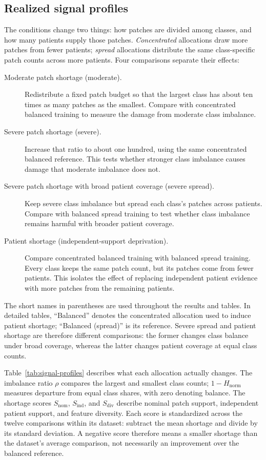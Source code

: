 \documentclass[11pt]{article}
\begin{document}
\subsection{Realized signal profiles}
\label{sec:rq1-profiles}
The conditions change two things: how patches are divided among classes, and how many patients supply those patches. \emph{Concentrated} allocations draw more patches from fewer patients; \emph{spread} allocations distribute the same class-specific patch counts across more patients. Four comparisons separate their effects:
\begin{description}
  \item[Moderate patch shortage (moderate).] Redistribute a fixed patch budget so that the largest class has about ten times as many patches as the smallest. Compare with concentrated balanced training to measure the damage from moderate class imbalance.
  \item[Severe patch shortage (severe).] Increase that ratio to about one hundred, using the same concentrated balanced reference. This tests whether stronger class imbalance causes damage that moderate imbalance does not.
  \item[Severe patch shortage with broad patient coverage (severe spread).] Keep severe class imbalance but spread each class's patches across patients. Compare with balanced spread training to test whether class imbalance remains harmful with broader patient coverage.
  \item[Patient shortage (independent-support deprivation).] Compare concentrated balanced training with balanced spread training. Every class keeps the same patch count, but its patches come from fewer patients. This isolates the effect of replacing independent patient evidence with more patches from the remaining patients.
\end{description}
\noindent The short names in parentheses are used throughout the results and tables. In detailed tables, ``Balanced'' denotes the concentrated allocation used to induce patient shortage; ``Balanced (spread)'' is its reference. Severe spread and patient shortage are therefore different comparisons: the former changes class balance under broad coverage, whereas the latter changes patient coverage at equal class counts.

Table~\ref{tab:signal-profiles} describes what each allocation actually changes. The imbalance ratio $\rho$ compares the largest and smallest class counts; $1-H_{\mathrm{norm}}$ measures departure from equal class shares, with zero denoting balance. The shortage scores $S_{\mathrm{nom}}$, $S_{\mathrm{ind}}$, and $S_{\mathrm{div}}$ describe nominal patch support, independent patient support, and feature diversity. Each score is standardized across the twelve comparisons within its dataset: subtract the mean shortage and divide by its standard deviation. A negative score therefore means a smaller shortage than the dataset's average comparison, not necessarily an improvement over the balanced reference.
\end{document}
